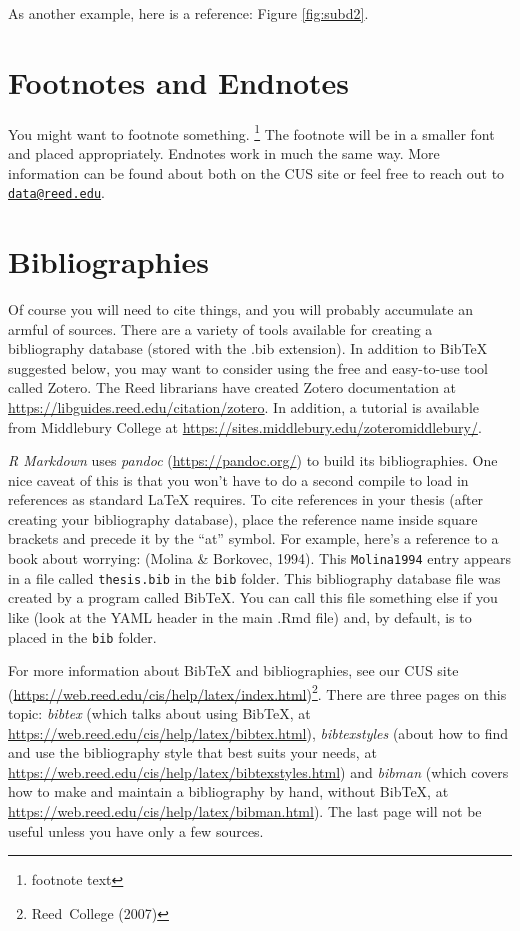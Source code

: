 As another example, here is a reference: Figure \ref{fig:subd2}.

\hypertarget{footnotes-and-endnotes}{%
\section{Footnotes and Endnotes}\label{footnotes-and-endnotes}}

You might want to footnote something. \footnote{footnote text} The footnote will be in a smaller font and placed appropriately. Endnotes work in much the same way. More information can be found about both on the CUS site or feel free to reach out to \href{mailto:data@reed.edu}{\nolinkurl{data@reed.edu}}.

\hypertarget{bibliographies}{%
\section{Bibliographies}\label{bibliographies}}

Of course you will need to cite things, and you will probably accumulate an armful of sources. There are a variety of tools available for creating a bibliography database (stored with the .bib extension). In addition to BibTeX suggested below, you may want to consider using the free and easy-to-use tool called Zotero. The Reed librarians have created Zotero documentation at \url{https://libguides.reed.edu/citation/zotero}. In addition, a tutorial is available from Middlebury College at \url{https://sites.middlebury.edu/zoteromiddlebury/}.

\emph{R Markdown} uses \emph{pandoc} (\url{https://pandoc.org/}) to build its bibliographies. One nice caveat of this is that you won't have to do a second compile to load in references as standard LaTeX requires. To cite references in your thesis (after creating your bibliography database), place the reference name inside square brackets and precede it by the ``at'' symbol. For example, here's a reference to a book about worrying: (Molina \& Borkovec, 1994). This \texttt{Molina1994} entry appears in a file called \texttt{thesis.bib} in the \texttt{bib} folder. This bibliography database file was created by a program called BibTeX. You can call this file something else if you like (look at the YAML header in the main .Rmd file) and, by default, is to placed in the \texttt{bib} folder.

For more information about BibTeX and bibliographies, see our CUS site (\url{https://web.reed.edu/cis/help/latex/index.html})\footnote{Reed~College (2007)}. There are three pages on this topic: \emph{bibtex} (which talks about using BibTeX, at \url{https://web.reed.edu/cis/help/latex/bibtex.html}), \emph{bibtexstyles} (about how to find and use the bibliography style that best suits your needs, at \url{https://web.reed.edu/cis/help/latex/bibtexstyles.html}) and \emph{bibman} (which covers how to make and maintain a bibliography by hand, without BibTeX, at \url{https://web.reed.edu/cis/help/latex/bibman.html}). The last page will not be useful unless you have only a few sources.

